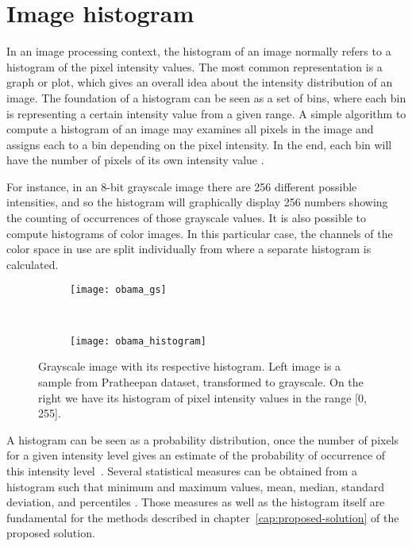 \section{Image histogram}
\label{sec:image_histogram}
In an image processing context, the histogram of an image normally refers to a histogram of the pixel intensity values. The most common representation is a graph or plot, which gives an overall idea about the intensity distribution of an image. The foundation of a histogram can be seen as a set of bins, where each bin is representing a certain intensity value from a given range. A simple algorithm to compute a histogram of an image may examines all pixels in the image and assigns each to a bin depending on the pixel intensity. In the end, each bin will have the number of pixels of its own intensity value \citep{gonzalez:02}.

For instance, in an 8-bit grayscale image there are 256 different possible intensities, and so the histogram will graphically display 256 numbers showing the counting of occurrences of those grayscale values. It is also possible to compute histograms of color images. In this particular case, the channels of the color space in use are split individually from where a separate histogram is calculated.

\begin{figure}[H]
    \centering
    \begin{subfigure}[t]{0.4\textwidth}
        \texttt{[image: obama\_gs]}
    \end{subfigure}
    ~
    \begin{subfigure}[t]{0.54\textwidth}
        \texttt{[image: obama\_histogram]}
    \end{subfigure}
    \caption[Grayscale image with its respective histogram]{Grayscale image with its respective histogram. Left image is a sample from Pratheepan dataset, transformed to grayscale. On the right we have its histogram of pixel intensity values in the range [0, 255].}
    \label{fig:obama_hist}
\end{figure}

A histogram can be seen as a probability distribution, once the number of pixels for a given intensity level gives an estimate of the probability of occurrence of this intensity level~\citep{gonzalez:02}. Several statistical measures can be obtained from a histogram such that minimum and maximum values, mean, median, standard deviation, and percentiles \citep{pedrini:08}. Those measures as well as the histogram itself are fundamental for the methods described in chapter~\ref{cap:proposed-solution} of the proposed solution.


